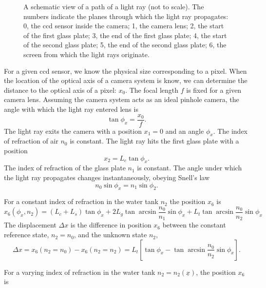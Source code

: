 \documentclass{article}
\begin{document}
\begin{figure}[hpbt]
	
	\caption{A schematic view of a path of a light ray (not to scale). The numbers indicate the planes through which the light ray propagates: 0, the ccd sensor inside the camera; 1, the camera lens; 2, the start of the first glass plate; 3, the end of the first glass plate; 4, the start of the second glass plate; 5, the end of the second glass plate; 6, the screen from which the light rays originate.}	
	\label{fig:schviepalira}
\end{figure}

For a given ccd sensor, we know the physical size corresponding to a pixel. When the location of the optical axis of a camera system is know, we can determine the distance to the optical axis of a pixel: $x_0$. The focal length $f$ is fixed for a given camera lens. Assuming the camera system acts as an ideal pinhole camera, the angle with which the light ray entered lens is
\begin{equation}
	\tan \phi_x = \frac{x_0}{f}.
\end{equation}
The light ray exits the camera with a position $x_1 = 0$ and an angle $\phi_x$. The index of refraction of air $n_0$ is constant. The light ray hits the first glass plate with a position
\begin{equation}
	x_2 = L_c \tan \phi_x.
\end{equation}
The index of refraction of the glass plate $n_1$ is constant. The angle under which the light ray propagates changes instantaneously, obeying Snell's law
\begin{equation}
	n_0 \sin \phi_x = n_1 \sin \phi_2.
\end{equation}

For a constant index of refraction in the water tank $n_2$ the position $x_6$ is
\begin{equation}
	x_6 (\phi_x, n_2) = (L_c+L_s) \tan \phi_x + 2 L_g \tan \arcsin \frac{n_0}{n_1} \sin \phi_x + L_t \tan \arcsin \frac{n_0}{n_2} \sin \phi_x
\end{equation}
The displacement $\Delta x$ is the difference in position $x_6$ between the constant reference state, $n_2 = n_0$, and the unknown state $n_2$, 
\begin{equation}
	\label{eq:dexcon2}
	\Delta x = x_6 (n_2 = n_0) - x_6 (n_2 = n_2) = L_t \left[ \tan \phi_x - \tan \arcsin \frac{n_0}{n_2} \sin \phi_x\right].
\end{equation}

For a varying index of refraction in the water tank $n_2 = n_2(\underline{x})$, the position $x_6$ is
\end{document}
